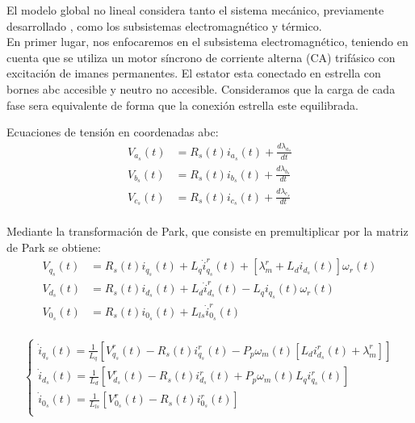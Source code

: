 \documentclass{article}
\begin{document}
El modelo global no lineal considera tanto el sistema mecánico, previamente desarrollado
, como los subsistemas electromagnético y térmico.\\

En primer lugar, nos enfocaremos en el subsistema electromagnético, teniendo en cuenta que 
se utiliza un motor síncrono de corriente alterna (CA) trifásico con excitación de imanes 
permanentes. El estator esta conectado en estrella con bornes abc accesible y neutro no accesible.
Consideramos que la carga de cada fase sera equivalente de forma que la conexión estrella este equilibrada.

Ecuaciones de tensión en coordenadas abc:
\begin{equation}
    \begin{aligned}
        V_{a_{s}}(t) &= R_{s}(t)i_{a_{s}}(t) + \frac{d\lambda_{a_{s}}}{dt}\\
        V_{b_{s}}(t) &= R_{s}(t)i_{b_{s}}(t) + \frac{d\lambda_{b_{s}}}{dt}\\
        V_{c_{s}}(t) &= R_{s}(t)i_{c_{s}}(t) + \frac{d\lambda_{c_{s}}}{dt}\\
    \end{aligned}
\end{equation}

Mediante la transformación de Park, que consiste en premultiplicar por la matriz de Park se obtiene:
\begin{equation}
    \begin{aligned}
        V_{q_{s}}(t) &= R_{s}(t)i_{q_{s}}(t) + L_{q}\dot{i}_{q_{s}}^r(t) + [\lambda_{m}^r + L_{d}i_{d_{s}}(t)]\omega_{r}(t)\\
        V_{d_{s}}(t) &= R_{s}(t)i_{d_{s}}(t) + L_{d}\dot{i}_{d_{s}}^r(t)  - L_{q}i_{q_{s}}(t)\omega_{r}(t)\\
        V_{0_{s}}(t) &= R_{s}(t)i_{0_{s}}(t) + L_{ls}\dot{i}_{0_{s}}^r(t) \\
    \end{aligned}
\end{equation}

\begin{equation}
    \begin{cases}
        \dot{i}_{q_{s}}(t) = \frac{1}{L_{q}}[V_{q_{s}}^r(t) - R_{s}(t)i_{q_{s}}^r(t) - P_{p}\omega_{m}(t)[L_{d}i_{d_{s}}^r(t)+\lambda_{m}^r]]  \\
        \dot{i}_{d_{s}}(t) = \frac{1}{L_{d}}[V_{d_{s}}^r(t) - R_{s}(t)i_{d_{s}}^r(t) + P_{p}\omega_{m}(t)L_{q}i_{q_{s}}^r(t)]  \\
        \dot{i}_{0_{s}}(t) = \frac{1}{L_{ls}}[V_{0_{s}}^r(t) - R_{s}(t)i_{0_{s}}^r(t)]  \\
    \end{cases}
\end{equation}
\end{document}
